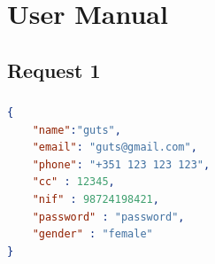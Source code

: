\documentclass[a4paper, 11pt]{article}
\begin{document}
\section{User Manual}

\subsection{Request 1}
\vspace{1em}

\subsubsection{}
\begin{lstlisting}[language=json]
{
    "name":"guts",
    "email": "guts@gmail.com",
    "phone": "+351 123 123 123",
    "cc" : 12345,
    "nif" : 98724198421,
    "password" : "password", 
    "gender" : "female"
}
\end{lstlisting}
\end{document}
